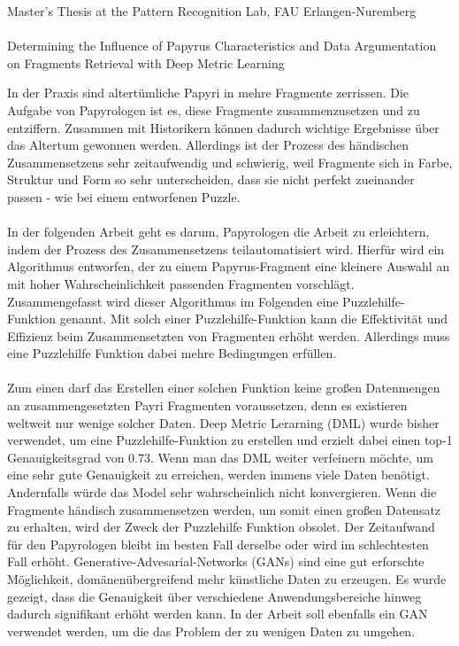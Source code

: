 \documentclass[12pt,a4paper]{article}
\begin{document}
\begin{center}
	Master's Thesis at the Pattern Recognition Lab, FAU Erlangen-Nuremberg \hfill \\[5mm]
																				
	\mbox{}\\
	{\Large Determining the Influence of Papyrus Characteristics and Data Argumentation on Fragments Retrieval with Deep Metric Learning}
			
\end{center}


In der Praxis sind altertümliche Papyri in mehre Fragmente zerrissen. 
Die Aufgabe von Papyrologen ist es, diese Fragmente zusammenzusetzen und zu entziffern. Zusammen mit Historikern können dadurch wichtige Ergebnisse über das Altertum gewonnen werden. Allerdings ist der Prozess des händischen Zusammensetzens sehr zeitaufwendig und schwierig, weil Fragmente sich in Farbe, Struktur und Form so sehr unterscheiden, dass sie nicht perfekt zueinander passen - wie bei einem entworfenen Puzzle. 
\\\\
In der folgenden Arbeit geht es darum, Papyrologen die Arbeit zu erleichtern, indem der Prozess des Zusammensetzens teilautomatisiert wird. 
Hierfür wird ein Algorithmus entworfen, der zu einem Papyrus-Fragment eine kleinere Auswahl an mit hoher Wahrscheinlichkeit passenden Fragmenten vorschlägt. 
Zusammengefasst wird dieser Algorithmus im Folgenden eine Puzzlehilfe-Funktion genannt.
Mit solch einer Puzzlehilfe-Funktion kann die Effektivität und Effizienz beim Zusammensetzten von Fragmenten erhöht werden. 
Allerdings muss eine Puzzlehilfe Funktion dabei mehre Bedingungen erfüllen.
\\\\
Zum einen darf das Erstellen einer solchen Funktion keine großen Datenmengen an zusammengesetzten Payri Fragmenten voraussetzen, denn es existieren weltweit nur wenige solcher Daten. Deep Metric Lerarning (DML) wurde bisher verwendet, um eine Puzzlehilfe-Funktion zu erstellen und erzielt dabei einen top-1 Genauigkeitsgrad von 0.73. 
Wenn man das DML weiter verfeinern möchte, um eine sehr gute Genauigkeit zu erreichen, werden immens viele Daten benötigt. Andernfalls würde das Model sehr wahrscheinlich nicht konvergieren. Wenn die Fragmente händisch zusammensetzen werden, um somit einen großen Datensatz zu erhalten, wird der Zweck der Puzzlehilfe Funktion obsolet.
Der Zeitaufwand für den Papyrologen bleibt im besten Fall derselbe oder wird im schlechtesten Fall erhöht. Generative-Advesarial-Networks (GANs) sind eine gut erforschte Möglichkeit, domänenübergreifend mehr künstliche Daten zu erzeugen. Es wurde gezeigt, dass die Genauigkeit über verschiedene Anwendungsbereiche hinweg dadurch signifikant erhöht werden kann. In der Arbeit soll ebenfalls ein GAN verwendet werden, um die das Problem der zu wenigen Daten zu umgehen. 
\end{document}
